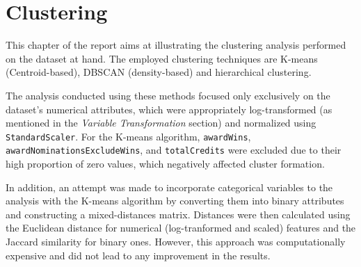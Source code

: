 \chapter{Clustering}
\label{ch:capitolo2}

This chapter of the report aims at illustrating the clustering analysis performed on the dataset at hand.
The employed clustering techniques are K-means (Centroid-based), DBSCAN (density-based) and hierarchical clustering.

The analysis conducted using these methods focused only exclusively on the dataset's numerical attributes, which were appropriately log-transformed (as mentioned in the \textit{Variable Transformation} section) and normalized using \texttt{StandardScaler}.  
For the K-means algorithm, \texttt{awardWins}, \texttt{awardNominationsExcludeWins}, and \texttt{totalCredits} were excluded due to their high proportion of zero values, which negatively affected cluster formation.

In addition, an attempt was made to incorporate categorical variables to the analysis with the K-means algorithm by converting them into binary attributes and constructing a mixed-distances matrix. 
Distances were then calculated using the Euclidean distance for numerical (log-tranformed and scaled) features and the Jaccard similarity for binary ones. 
However, this approach was computationally expensive and did not lead to any improvement in the results.

